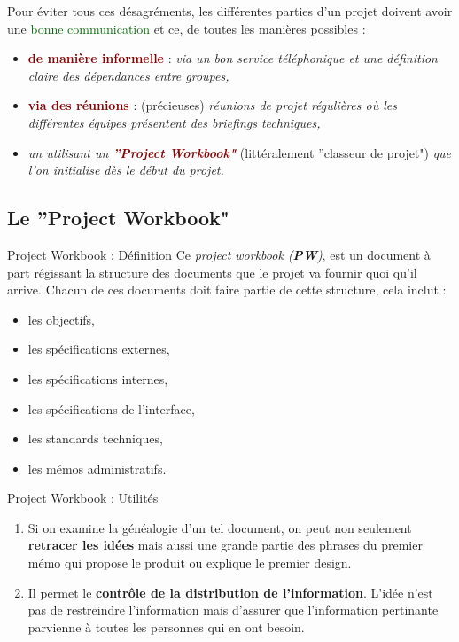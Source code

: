 \documentclass{beamer}
\newcommand{\gre}[1]{\textcolor{darkgreen}{#1}}
\newcommand{\red}[1]{\textcolor{darkred}{#1}}
\begin{document}
\begin{frame}
Pour éviter tous ces désagréments, les différentes parties d'un projet doivent avoir une \gre{bonne communication} et ce, de 
toutes les manières possibles :
\begin{itemize}
\pause \item \textbf{\red{de manière informelle}} : \textit{via un bon service téléphonique et une définition claire des 
dépendances entre groupes,}
\pause \item \textbf{\red{via des réunions}} : (précieuses) \textit{réunions de projet régulières où les différentes équipes 
présentent des briefings techniques,}
\pause \item \textit{un utilisant un \textbf{\red{''Project Workbook"}}} (littéralement ''classeur de projet") \textit{que l'on 
initialise dès le début du projet.}
\end{itemize}
\end{frame}

\subsection{Le ''Project Workbook"}

\begin{frame}{Project Workbook : Définition}
Ce \textit{project workbook (\textbf{PW})}, est un document à part régissant la structure des documents que le projet va fournir
quoi qu'il arrive. Chacun de ces documents doit faire partie de cette structure, cela inclut :
\begin{itemize}
\pause \item les objectifs,
\pause \item les spécifications externes,
\pause \item les spécifications internes,
\pause \item les spécifications de l'interface,
\pause \item les standards techniques,
\pause \item les mémos administratifs.
\end{itemize}
\end{frame}

\begin{frame}{Project Workbook : Utilités}
\begin{enumerate}
\item Si on examine la généalogie d'un tel document, on peut non seulement \textbf{retracer les idées} mais aussi une grande 
partie des phrases du premier mémo qui propose le produit ou explique le premier design.
\pause\item Il permet le \textbf{contrôle de la distribution de l'information}. L'idée n'est pas de restreindre l'information mais 
d'assurer que l'information pertinante parvienne à toutes les personnes qui en ont besoin.
\end{enumerate}
\end{frame}
\end{document}
